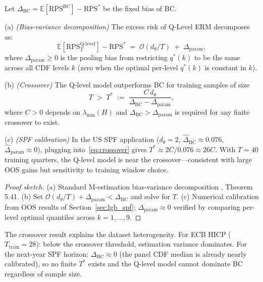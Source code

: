 \begin{proposition}
\label{prop:crossover}
Let $\Delta_{\mathrm{BC}} = \mathbb{E}[\mathrm{RPS}^{\mathrm{BC}}] - \mathrm{RPS}^*$
be the fixed bias of BC.

\noindent(a) \emph{(Bias-variance decomposition)} The excess risk of Q-Level ERM decomposes as:
\begin{equation}
  \mathbb{E}[\mathrm{RPS}^{\mathrm{Q\text{-}level}}_T] - \mathrm{RPS}^*
    \;=\;
    \mathcal{O}(d_\theta / T)
    \;+\;
    \Delta_{\mathrm{param}},
\end{equation}
where $\Delta_{\mathrm{param}} \geq 0$ is the pooling bias from restricting $q^*(k)$ to
be the same across all CDF levels $k$ (zero when the optimal per-level $q^*(k)$ is constant in $k$).

\noindent(b) \emph{(Crossover)} The Q-level model outperforms BC for training samples of size
\begin{equation}
  T \;>\; T^* \;:=\; \frac{C\, d_\theta}{\Delta_{\mathrm{BC}} - \Delta_{\mathrm{param}}},
  \label{eq:crossover}
\end{equation}
where $C > 0$ depends on $\lambda_{\min}(H)$ and $\Delta_{\mathrm{BC}} > \Delta_{\mathrm{param}}$
is required for any finite crossover to exist.

\noindent(c) \emph{(SPF calibration)} In the US SPF application ($d_\theta = 2$,
$\hat\Delta_{\mathrm{BC}} \approx 0.076$, $\hat\Delta_{\mathrm{param}} \approx 0$),
plugging into~\eqref{eq:crossover} gives $T^* \approx 2C / 0.076 \approx 26C$.
With $T = 40$ training quarters, the Q-level model is near the crossover---consistent
with large OOS gains but sensitivity to training window choice.
\end{proposition}

\begin{proof}[Proof sketch]
(a) Standard M-estimation bias-variance decomposition \cite{van2000asymptotic}, Theorem 5.41.
(b) Set $\mathcal{O}(d_\theta/T) + \Delta_{\mathrm{param}} < \Delta_{\mathrm{BC}}$ and solve for $T$.
(c) Numerical calibration from OOS results of Section~\ref{sec:lgb_spf}; $\Delta_{\mathrm{param}} \approx 0$
verified by comparing per-level optimal quantiles across $k=1,\ldots,9$.
\end{proof}

\begin{remark}
The crossover result explains the dataset heterogeneity.
For ECB HICP ($T_{\mathrm{train}} = 28$): below the crossover threshold, estimation variance
dominates.
For the next-year SPF horizon: $\Delta_{\mathrm{BC}} \approx 0$ (the panel CDF median is already
nearly calibrated), so no finite $T^*$ exists and the Q-level model cannot dominate BC
regardless of sample size.
\end{remark}

